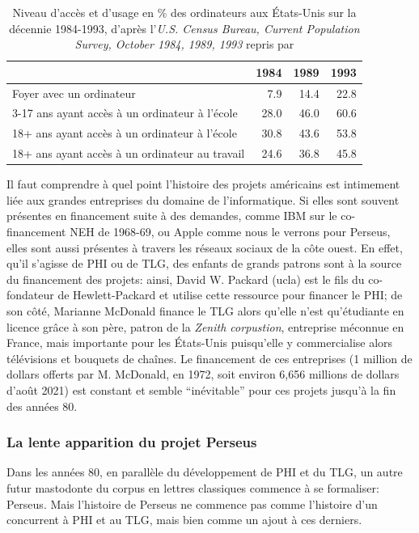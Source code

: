 \begin{table}[ht]
\centering
\begin{tabular}{l|rrr}
                                               & 1984 & 1989 & 1993 \\ \hline  \hline
Foyer avec un ordinateur                       & 7.9  & 14.4 & 22.8 \\ \hline
3-17 ans ayant accès à un ordinateur à l'école & 28.0 & 46.0 & 60.6 \\
18+ ans ayant accès à un ordinateur à l'école  & 30.8 & 43.6 & 53.8 \\
18+ ans ayant accès à un ordinateur au travail & 24.6 & 36.8 & 45.8 \\ \hline
\end{tabular}
\caption{Niveau d'accès et d'usage en \% des ordinateurs aux États-Unis sur la décennie 1984-1993, d'après l'\textit{U.S. Census Bureau, Current Population Survey, October 1984, 1989, 1993} repris par \cite{kominski1999access}}
\label{tab:computer-ownership}
\end{table}

Il faut comprendre à quel point l'histoire des projets américains est intimement liée aux grandes entreprises du domaine de l'informatique. Si elles sont souvent présentes en financement suite à des demandes, comme IBM sur le co-financement NEH de 1968-69, ou Apple comme nous le verrons pour Perseus, elles sont aussi présentes à travers les réseaux sociaux de la côte ouest. En effet, qu'il s'agisse de PHI ou de TLG, des enfants de grands patrons sont à la source du financement des projets: ainsi, David W. Packard (\acrshort{ucla}) est le fils du co-fondateur de Hewlett-Packard et utilise cette ressource pour financer le PHI; de son côté, Marianne McDonald finance le TLG alors qu'elle n'est qu'étudiante en licence grâce à son père, patron de la \textit{Zenith corpustion}, entreprise méconnue en France, mais importante pour les États-Unis puisqu'elle y commercialise alors télévisions et bouquets de chaînes. Le financement de ces entreprises (1 million de dollars offerts par M. McDonald, en 1972, soit environ 6,656 millions de dollars d'août 2021) est constant et semble \enquote{inévitable} pour ces projets jusqu'à la fin des années 80.

\subsubsection{La lente apparition du projet Perseus}

Dans les années 80, en parallèle du développement de PHI et du TLG, un autre futur mastodonte du corpus en lettres classiques commence à se formaliser: Perseus. Mais l'histoire de Perseus ne commence pas comme l'histoire d'un concurrent à PHI et au TLG, mais bien comme un ajout à ces derniers. 

